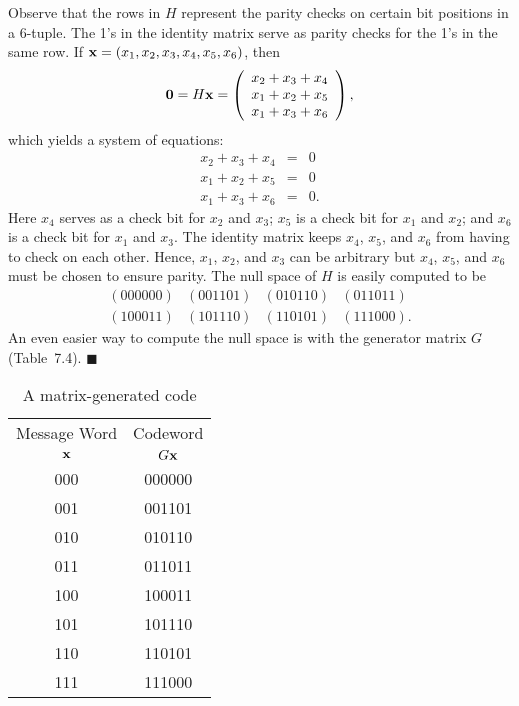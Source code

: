  
Observe that the rows in $H$  represent the parity checks on certain
bit positions in a 6-tuple. The 1's in the identity matrix serve as
parity checks for the 1's in the same row. If ${\bold x} = (x_1, x_2,
x_3, x_4, x_5, x_6)$, then 
\[
{\bold 0}
=
H{\bold x}
=
\left(
\begin{array}{l}
x_2 + x_3 + x_4 \\
x_1 + x_2 + x_5\\
x_1 + x_3 + x_6
\end{array}
\right),
\]
which yields a system of equations:
\begin{eqnarray*}
x_2 + x_3 + x_4 & = & 0 \\
x_1 + x_2 + x_5 & = & 0 \\
x_1 + x_3 + x_6 & = & 0.
\end{eqnarray*}
Here $x_4$ serves as a check bit for $x_2$ and $x_3$; $x_5$ is a check
bit for $x_1$ and $x_2$; and $x_6$ is a check bit for $x_1$ and $x_3$.
The identity matrix keeps $x_4$, $x_5$, and $x_6$ from having to check
on each other. Hence, $x_1$, $x_2$, and $x_3$ can be arbitrary but
$x_4$, $x_5$, and $x_6$ must be chosen to ensure parity. The null
space of $H$ is easily computed to be
\[
\begin{array}{cccc}
 (000000) & (001101) & (010110) & (011011) \\
 (100011) & (101110) & (110101) & (111000).
\end{array}
\]
An even easier way to compute the null space is with the generator
matrix $G$ (Table~7.4). 
\hspace{\fill} $\blacksquare$
 
 
\begin{table}[htb]
\caption{A matrix-generated code}{\small
\begin{center}
\begin{tabular}{|c|c|}
\hline
Message Word  & Codeword \\
${\bold x}$ & $G {\bold x}$ \\ \hline
000 & 000000 \\
001 & 001101 \\
010 & 010110 \\
011 & 011011 \\
100 & 100011 \\
101 & 101110 \\
110 & 110101 \\
111 & 111000 \\
\hline
\end{tabular}
\end{center}
}
\end{table}
 
